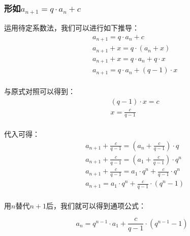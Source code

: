 \documentclass[UTF8]{ctexart}
\begin{document}
\newpage

\subsubsection{形如{\large$a_{n+1}=q\cdot a_{n}+c$}}
    运用待定系数法，我们可以进行如下推导：
    \setcounter{equation}{0}
    \begin{align}
        &a_{n+1}=q\cdot a_n+c\\[2mm]
        &a_{n+1}+x=q\cdot(a_n+x)\\[2mm]
        &a_{n+1}+x=q\cdot a_n+q\cdot x\\[2mm]
        &a_{n+1}=q\cdot a_n+(q-1)\cdot x
    \end{align}\\
    与原式对照可以得到：
    \begin{align}
        &(q-1)\cdot x=c\\[3mm]
        &x=\frac{c}{q-1}
    \end{align}\\
    代入可得：
    \begin{align}
        &a_{n+1}+\frac{c}{q-1}=\left(a_n+\frac{c}{q-1}\right)\cdot q\\[3mm]
        &a_{n+1}+\frac{c}{q-1}=\left(a_1+\frac{c}{q-1}\right)\cdot q^n\\[3mm]
        &a_{n+1}+\frac{c}{q-1}=a_1\cdot q^n+\frac{c}{q-1}\cdot q^n\\[3mm]
        &a_{n+1}=a_1\cdot q^n+\frac{c}{q-1}\cdot (q^n-1)
    \end{align}\\
    用$n$替代$n+1$后，我们就可以得到通项公式：
    \begin{large}
    \begin{equation*}
        a_{n}=q^{n-1}\cdot a_1+\frac{c}{q-1}\cdot (q^{n-1}-1)
    \end{equation*}
    \end{large}

\newpage
\end{document}
